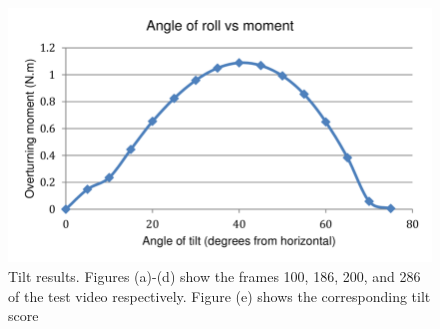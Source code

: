 \documentclass{sig-alternate}
\begin{document}
\begin{figure}
    \centering
    \includegraphics[width = \linewidth]{4.png}
    \caption{Tilt results. Figures (a)-(d) show the frames 100, 186,
200, and 286 of the test video respectively. Figure (e) shows the
corresponding tilt score}
    \label{fig: 4}
\end{figure}
\end{document}
